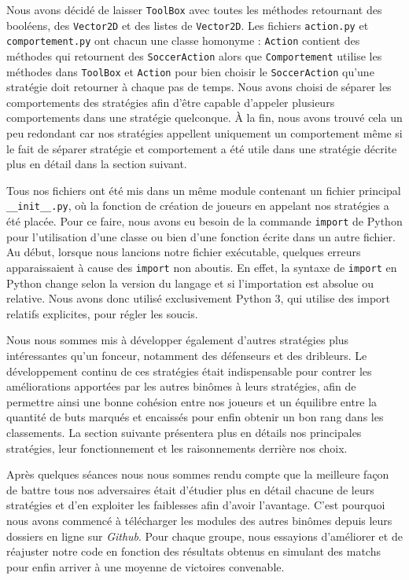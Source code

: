 \documentclass[a4paper,12pt]{article}
\numberwithin{equation}{section}
\begin{document}
Nous avons décidé de laisser \texttt{ToolBox} avec toutes les méthodes retournant des booléens, des \texttt{Vector2D} et des listes de \texttt{Vector2D}. Les fichiers \texttt{action.py} et \texttt{comportement.py} ont chacun une classe homonyme : \texttt{Action} contient des méthodes qui retournent des \texttt{SoccerAction} alors que \texttt{Comportement} utilise les méthodes dans \texttt{ToolBox} et \texttt{Action} pour bien choisir le \texttt{SoccerAction} qu'une stratégie doit retourner à chaque pas de temps. Nous avons choisi de séparer les comportements des stratégies afin d’être capable d’appeler plusieurs comportements dans une stratégie quelconque. À la fin, nous avons trouvé cela un peu redondant car nos stratégies appellent uniquement un comportement même si le fait de séparer stratégie et comportement a été utile dans une stratégie décrite plus en détail dans la section suivant.

Tous nos fichiers ont été mis dans un même module contenant un fichier principal \texttt{\_\_init\_\_.py}, où la fonction de création de joueurs en appelant nos stratégies a été placée. Pour ce faire, nous avons eu besoin de la commande \texttt{import} de Python pour l'utilisation d’une classe ou bien d’une fonction écrite dans un autre fichier. Au début, lorsque nous lancions notre fichier exécutable, quelques erreurs apparaissaient à cause des \texttt{import} non aboutis. En effet, la syntaxe de \texttt{import} en Python change selon la version du langage et si l'importation est absolue ou relative. Nous avons donc utilisé exclusivement Python 3, qui utilise des import relatifs explicites, pour régler les soucis.

Nous nous sommes mis à développer également d’autres stratégies plus intéressantes qu’un fonceur, notamment des défenseurs et des dribleurs. Le développement continu de ces stratégies était indispensable pour contrer les améliorations apportées par les autres binômes à leurs stratégies, afin de permettre ainsi une bonne cohésion entre nos joueurs et un équilibre entre la quantité de buts marqués et encaissés pour enfin obtenir un bon rang dans les classements. La section suivante présentera plus en détails nos principales stratégies, leur fonctionnement et les raisonnements derrière nos choix.

Après quelques séances nous nous sommes rendu compte que la meilleure façon de battre tous nos adversaires était d’étudier plus en détail chacune de leurs stratégies et d’en exploiter les faiblesses afin d'avoir l’avantage. C’est pourquoi nous avons commencé à télécharger les modules des autres binômes depuis leurs dossiers en ligne sur \emph{Github}. Pour chaque groupe, nous essayions d’améliorer et de réajuster notre code en fonction des résultats obtenus en simulant des matchs pour enfin arriver à une moyenne de victoires convenable. 
\end{document}
